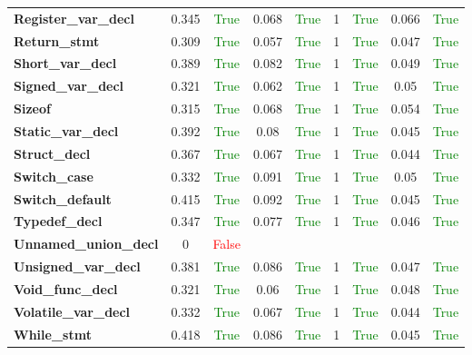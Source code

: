 \documentclass{article}
\begin{document}
\begin{xltabular}{\textwidth}{lcccccccc}
\textbf{{\fontsize{10}{12}\selectfont Register\_var\_decl}}& 0.345&\textcolor{green}{True}& 0.068&\textcolor{green}{True}& 1&\textcolor{green}{True}& 0.066&\textcolor{green}{True} \\[0.5ex]
\textbf{{\fontsize{10}{12}\selectfont Return\_stmt}}& 0.309&\textcolor{green}{True}& 0.057&\textcolor{green}{True}& 1&\textcolor{green}{True}& 0.047&\textcolor{green}{True} \\[0.5ex]
\textbf{{\fontsize{10}{12}\selectfont Short\_var\_decl}}& 0.389&\textcolor{green}{True}& 0.082&\textcolor{green}{True}& 1&\textcolor{green}{True}& 0.049&\textcolor{green}{True} \\[0.5ex]
\textbf{{\fontsize{10}{12}\selectfont Signed\_var\_decl}}& 0.321&\textcolor{green}{True}& 0.062&\textcolor{green}{True}& 1&\textcolor{green}{True}& 0.05&\textcolor{green}{True} \\[0.5ex]
\textbf{{\fontsize{10}{12}\selectfont Sizeof}}& 0.315&\textcolor{green}{True}& 0.068&\textcolor{green}{True}& 1&\textcolor{green}{True}& 0.054&\textcolor{green}{True} \\[0.5ex]
\textbf{{\fontsize{10}{12}\selectfont Static\_var\_decl}}& 0.392&\textcolor{green}{True}& 0.08&\textcolor{green}{True}& 1&\textcolor{green}{True}& 0.045&\textcolor{green}{True} \\[0.5ex]
\textbf{{\fontsize{10}{12}\selectfont Struct\_decl}}& 0.367&\textcolor{green}{True}& 0.067&\textcolor{green}{True}& 1&\textcolor{green}{True}& 0.044&\textcolor{green}{True} \\[0.5ex]
\textbf{{\fontsize{10}{12}\selectfont Switch\_case}}& 0.332&\textcolor{green}{True}& 0.091&\textcolor{green}{True}& 1&\textcolor{green}{True}& 0.05&\textcolor{green}{True} \\[0.5ex]
\textbf{{\fontsize{10}{12}\selectfont Switch\_default}}& 0.415&\textcolor{green}{True}& 0.092&\textcolor{green}{True}& 1&\textcolor{green}{True}& 0.045&\textcolor{green}{True} \\[0.5ex]
\textbf{{\fontsize{10}{12}\selectfont Typedef\_decl}}& 0.347&\textcolor{green}{True}& 0.077&\textcolor{green}{True}& 1&\textcolor{green}{True}& 0.046&\textcolor{green}{True} \\[0.5ex]
\textbf{{\fontsize{10}{12}\selectfont Unnamed\_union\_decl}}& 0&\textcolor{red}{False} \\[0.5ex]
\textbf{{\fontsize{10}{12}\selectfont Unsigned\_var\_decl}}& 0.381&\textcolor{green}{True}& 0.086&\textcolor{green}{True}& 1&\textcolor{green}{True}& 0.047&\textcolor{green}{True} \\[0.5ex]
\textbf{{\fontsize{10}{12}\selectfont Void\_func\_decl}}& 0.321&\textcolor{green}{True}& 0.06&\textcolor{green}{True}& 1&\textcolor{green}{True}& 0.048&\textcolor{green}{True} \\[0.5ex]
\textbf{{\fontsize{10}{12}\selectfont Volatile\_var\_decl}}& 0.332&\textcolor{green}{True}& 0.067&\textcolor{green}{True}& 1&\textcolor{green}{True}& 0.044&\textcolor{green}{True} \\[0.5ex]
\textbf{{\fontsize{10}{12}\selectfont While\_stmt}}& 0.418&\textcolor{green}{True}& 0.086&\textcolor{green}{True}& 1&\textcolor{green}{True}& 0.045&\textcolor{green}{True} \\[0.5ex]
\bottomrule
\end{xltabular}
\end{document}
